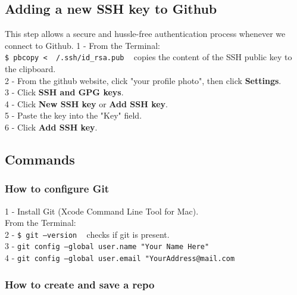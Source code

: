 \documentclass{article}
\begin{document}
{{\subsection{Adding a new SSH key to Github}
This step allows a secure and hussle-free authentication process whenever we connect to Github. 
1 - From the Terminal:\\
\texttt{\$ pbcopy < ~/.ssh/id\_rsa.pub} ~ copies the content of the SSH public key to the clipboard. \\
2 - From the github website, click "your profile photo", then click \textbf{Settings}.\\
3 - Click \textbf{SSH and GPG keys}.\\
4 - Click \textbf{New SSH key} or \textbf{Add SSH key}.\\
5 - Paste the key into the "Key" field.\\
6 - Click \textbf{Add SSH key}.\\

\subsection{Commands}
\subsubsection{How to configure Git}

1 - Install Git (Xcode Command Line Tool for Mac). \\
From the Terminal:\\
2 - \texttt{\$ git --version} ~ checks if git is present.\\
3 - \texttt{git config --global user.name "Your Name Here"} \\
4 - \texttt{git config --global user.email "YourAddress@mail.com}\\

\subsubsection{How to create and save a repo}

}}
\end{document}
